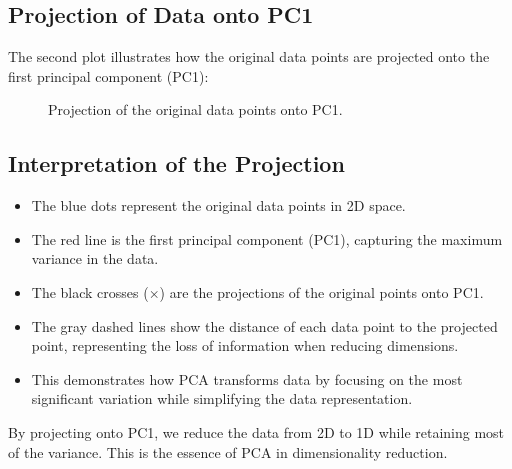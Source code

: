 \documentclass{article}
\begin{document}
\subsection*{Projection of Data onto PC1}
The second plot illustrates how the original data points are projected onto the first principal component (PC1):

\begin{figure}[ht]
    \centering
    \caption{Projection of the original data points onto PC1.}
    \label{fig:projection}
\end{figure}

\subsection*{Interpretation of the Projection}
\begin{itemize}
    \item The blue dots represent the original data points in 2D space.
    \item The red line is the first principal component (PC1), capturing the maximum variance in the data.
    \item The black crosses (\(\times\)) are the projections of the original points onto PC1.
    \item The gray dashed lines show the distance of each data point to the projected point, representing the loss of information when reducing dimensions.
    \item This demonstrates how PCA transforms data by focusing on the most significant variation while simplifying the data representation.
\end{itemize}

By projecting onto PC1, we reduce the data from 2D to 1D while retaining most of the variance. This is the essence of PCA in dimensionality reduction.
\end{document}
